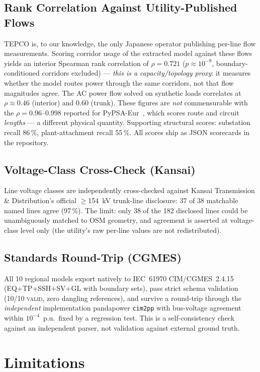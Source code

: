 \documentclass[journal]{IEEEtran}
\begin{document}
\subsection{Rank Correlation Against Utility-Published Flows}
TEPCO is, to our knowledge, the only Japanese operator publishing
per-line flow measurements. Scoring corridor usage of the extracted
model against these flows yields an interior Spearman rank correlation
of $\rho=0.721$ ($p\approx10^{-9}$, boundary-conditioned corridors
excluded) --- \textit{this is a capacity/topology proxy}: it measures
whether the model routes power through the same corridors, not that
flow magnitudes agree. The AC power flow solved on synthetic loads
correlates at $\rho\approx0.46$ (interior) and $0.60$ (trunk).
These figures are \textit{not} commensurable with the
$\rho=0.96$--$0.998$ reported for PyPSA-Eur~\cite{xiong2025}, which
scores route and circuit \textit{lengths} --- a different physical
quantity. Supporting structural scores: substation recall 86\,\%,
plant-attachment recall 55\,\%. All scores ship as JSON scorecards in
the repository.

\subsection{Voltage-Class Cross-Check (Kansai)}
Line voltage classes are independently cross-checked against Kansai
Transmission \& Distribution's official $\geq$154~kV trunk-line
disclosure: 37 of 38 matchable named lines agree (97\,\%). The limit:
only 38 of the 182 disclosed lines could be unambiguously matched to
OSM geometry, and agreement is asserted at voltage-class level only
(the utility's raw per-line values are not redistributed).

\subsection{Standards Round-Trip (CGMES)}
All 10 regional models export natively to IEC~61970 CIM/CGMES~2.4.15
(EQ+TP+SSH+SV+GL with boundary sets), pass strict schema validation
(10/10 \textsc{valid}, zero dangling references), and survive a
round-trip through the \textit{independent} implementation pandapower
\texttt{cim2pp} with bus-voltage agreement within $10^{-4}$~p.u.\ fixed
by a regression test. This is a self-consistency check against an
independent parser, not validation against external ground truth.

\section{Limitations}
\end{document}
